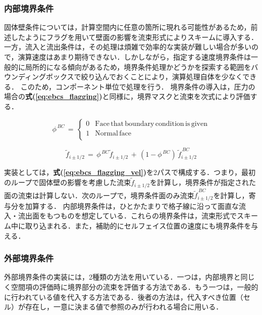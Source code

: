 %
\subsubsection{内部境界条件}
固体壁条件については，計算空間内に任意の箇所に現れる可能性があるため，前述したようにフラグを用いて壁面の影響を流束形式によりスキームに導入する．
一方，流入と流出条件は，その処理は煩雑で効率的な実装が難しい場合が多いので，演算速度はあまり期待できない．しかしながら，指定する速度境界条件は一般的に局所的になる傾向があるため，境界条件処理かどうかを探索する範囲をバウンディングボックスで絞り込んでおくことにより，演算処理自体を少なくできる．
このため，コンポーネント単位で処理を行う．
境界条件の導入は，圧力の場合の\textbf{式(\ref{eq:ebcs_flagging})}と同様に，境界マスクと流束を次式により評価する．

\begin{equation}
\phi^{\,BC} \,=\, \left\{
\begin{array}{ll}
0 & \mathrm{Face\, that\, boundary\, condition\, is\, given}\\
1 & \mathrm{Normal\, face}\\
\end{array} \right.
\label{eq:mask function velocity}
\end{equation}

\begin{equation}
\tilde{f}_{i\pm1/2} \,=\, \phi^{\,BC} \tilde{f}_{i\pm1/2} \,+\, \left( 1-\phi^{\,BC} \right)\, \tilde{f}_{i\pm1/2}^{\,BC}
\label{eq:ebcs_flagging_vel}
\end{equation}

\noindent 実装としては，\textbf{式(\ref{eq:ebcs_flagging_vel})}を2パスで構成する．つまり，最初のループで固体壁の影響を考慮した流束$\tilde{f}_{i\pm1/2}$を計算し，境界条件が指定された面の流束は計算しない．次のループで，境界条件面のみ流束$\tilde{f}^{\,BC}_{i\pm1/2}$を計算し，寄与分を加算する．
内部境界条件は，ひとかたまりで格子線に沿って面直な流入・流出面をもつものを想定している．これらの境界条件は，流束形式でスキーム中に取り込まれる．また，補助的にセルフェイス位置の速度にも境界条件を与える．

%
\subsubsection{外部境界条件}
外部境界条件の実装には，2種類の方法を用いている．一つは，内部境界と同じく空間項の評価時に境界部分の流束を評価する方法である．もう一つは，一般的に行われている値を代入する方法である．後者の方法は，代入すべき位置（セル）が存在し，一意に決まる値で参照のみが行われる場合に用いる．

